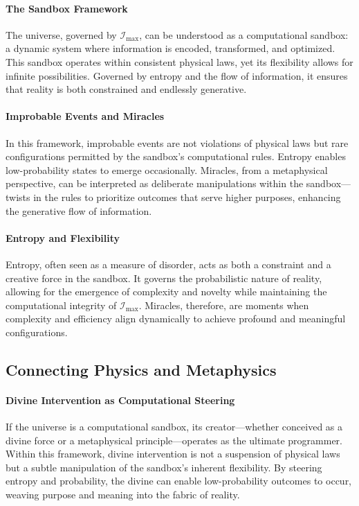\documentclass[12pt]{article}
\begin{document}
\paragraph{The Sandbox Framework}
The universe, governed by \(\mathcal{I}_{\text{max}}\), can be understood as a computational sandbox: a dynamic system where information is encoded, transformed, and optimized. This sandbox operates within consistent physical laws, yet its flexibility allows for infinite possibilities. Governed by entropy and the flow of information, it ensures that reality is both constrained and endlessly generative.

\paragraph{Improbable Events and Miracles}
In this framework, improbable events are not violations of physical laws but rare configurations permitted by the sandbox’s computational rules. Entropy enables low-probability states to emerge occasionally. Miracles, from a metaphysical perspective, can be interpreted as deliberate manipulations within the sandbox—twists in the rules to prioritize outcomes that serve higher purposes, enhancing the generative flow of information.

\paragraph{Entropy and Flexibility}
Entropy, often seen as a measure of disorder, acts as both a constraint and a creative force in the sandbox. It governs the probabilistic nature of reality, allowing for the emergence of complexity and novelty while maintaining the computational integrity of \(\mathcal{I}_{\text{max}}\). Miracles, therefore, are moments when complexity and efficiency align dynamically to achieve profound and meaningful configurations.

\subsection{Connecting Physics and Metaphysics}

\paragraph{Divine Intervention as Computational Steering}
If the universe is a computational sandbox, its creator—whether conceived as a divine force or a metaphysical principle—operates as the ultimate programmer. Within this framework, divine intervention is not a suspension of physical laws but a subtle manipulation of the sandbox’s inherent flexibility. By steering entropy and probability, the divine can enable low-probability outcomes to occur, weaving purpose and meaning into the fabric of reality.
\end{document}
